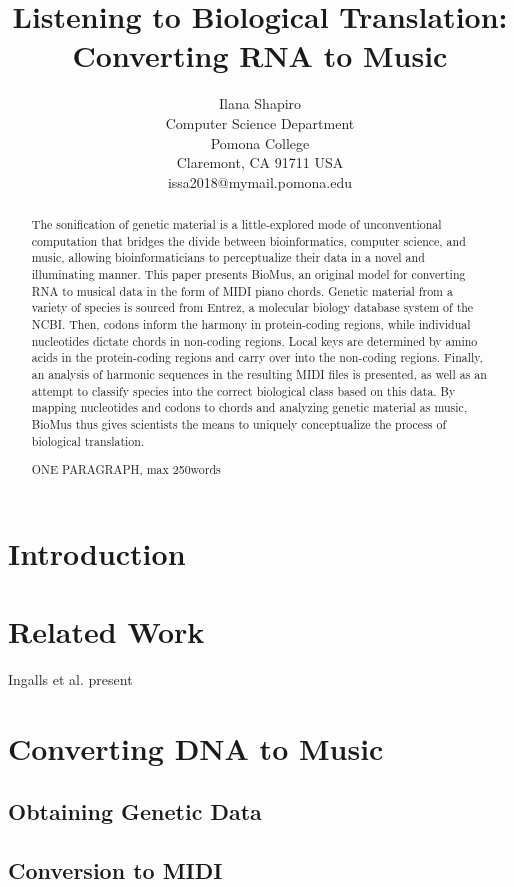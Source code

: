 \documentclass[letterpaper]{article}
\title{Listening to Biological Translation: Converting RNA to Music}
\author{Ilana Shapiro\\
Computer Science Department\\
Pomona College\\
Claremont, CA 91711 USA\\
issa2018@mymail.pomona.edu\\
}
\begin{document}
 
\maketitle
\begin{abstract}
The sonification of genetic material is a little-explored mode of unconventional computation that bridges the divide between bioinformatics, computer science, and music, allowing bioinformaticians to perceptualize their data in a novel and illuminating manner. This paper presents BioMus, an original model for converting RNA to musical data in the form of MIDI piano chords. Genetic material from a variety of species is sourced from Entrez, a molecular biology database system of the NCBI. Then, codons inform the harmony in protein-coding regions, while individual nucleotides dictate chords in non-coding regions. Local keys are determined by amino acids in the protein-coding regions and carry over into the non-coding regions. Finally, an analysis of harmonic sequences in the resulting MIDI files is presented, as well as an attempt to classify species into the correct biological class based on this data. By mapping nucleotides and codons to chords and analyzing genetic material as music, BioMus thus gives scientists the means to uniquely conceptualize the process of biological translation.

ONE PARAGRAPH, max 250words
\end{abstract}

\section{Introduction}

\section{Related Work}

Ingalls et al. present 

\section{Converting DNA to Music}

\subsection{Obtaining Genetic Data}

\subsection{Conversion to MIDI}
\end{document}
